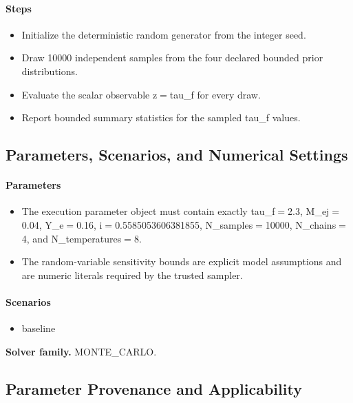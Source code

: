 \documentclass[11pt]{article}
\begin{document}
\paragraph{Steps}
\begin{itemize}\raggedright
\item Initialize the deterministic random generator from the integer seed.
\item Draw 10000 independent samples from the four declared bounded prior distributions.
\item Evaluate the scalar observable z\ensuremath{=}tau\_\allowbreak{}f for every draw.
\item Report bounded summary statistics for the sampled tau\_\allowbreak{}f values.
\end{itemize}

\subsection{Parameters, Scenarios, and Numerical Settings}

\paragraph{Parameters}
\begin{itemize}\raggedright
\item The execution parameter object must contain exactly tau\_\allowbreak{}f\ensuremath{=}2.3, M\_\allowbreak{}ej\ensuremath{=}0.04, Y\_\allowbreak{}e\ensuremath{=}0.16, i\ensuremath{=}0.5585053606381855, N\_\allowbreak{}samples\ensuremath{=}10000, N\_\allowbreak{}chains\ensuremath{=}4, and N\_\allowbreak{}temperatures\ensuremath{=}8.
\item The random-variable sensitivity bounds are explicit model assumptions and are numeric literals required by the trusted sampler.
\end{itemize}

\paragraph{Scenarios}
\begin{itemize}\raggedright
\item baseline
\end{itemize}

\noindent\textbf{Solver family.} MONTE\_CARLO.

\subsection{Parameter Provenance and Applicability}
\end{document}
